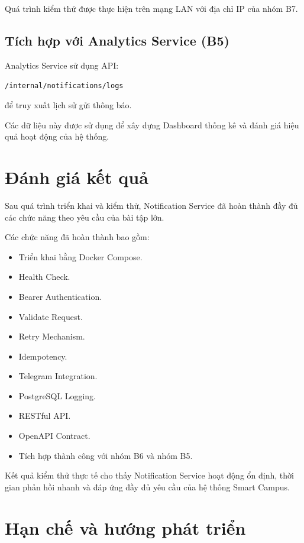 Quá trình kiểm thử được thực hiện trên mạng LAN với địa chỉ IP của nhóm B7.

\subsection{Tích hợp với Analytics Service (B5)}

Analytics Service sử dụng API:

\begin{center}
\texttt{/internal/notifications/logs}
\end{center}

để truy xuất lịch sử gửi thông báo.

Các dữ liệu này được sử dụng để xây dựng Dashboard thống kê và đánh giá hiệu quả hoạt động của hệ thống.

\section{Đánh giá kết quả}

Sau quá trình triển khai và kiểm thử, Notification Service đã hoàn thành đầy đủ các chức năng theo yêu cầu của bài tập lớn.

Các chức năng đã hoàn thành bao gồm:

\begin{itemize}
\item Triển khai bằng Docker Compose.
\item Health Check.
\item Bearer Authentication.
\item Validate Request.
\item Retry Mechanism.
\item Idempotency.
\item Telegram Integration.
\item PostgreSQL Logging.
\item RESTful API.
\item OpenAPI Contract.
\item Tích hợp thành công với nhóm B6 và nhóm B5.
\end{itemize}

Kết quả kiểm thử thực tế cho thấy Notification Service hoạt động ổn định, thời gian phản hồi nhanh và đáp ứng đầy đủ yêu cầu của hệ thống Smart Campus.

\section{Hạn chế và hướng phát triển}

